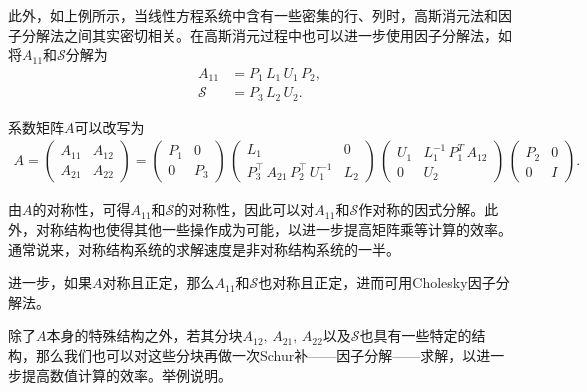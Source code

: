此外，如上例所示，当线性方程系统中含有一些密集的行、列时，高斯消元法和因子分解法之间其实密切相关。在高斯消元过程中也可以进一步使用因子分解法，如将$A_{11}$和$\mathcal{S}$分解为
\begin{equation*}
  \begin{split}
    A_{11} & = P_{1} \, L_{1} \, U_{1} \, P_{2}, \\
    \mathcal{S} & = P_{3} \, L_{2} \, U_{2}.
  \end{split}
\end{equation*}

系数矩阵$A$可以改写为
\begin{equation*}
  \begin{split}
    A =
    \begin{pmatrix}
      A_{11} & A_{12} \\
      A_{21} & A_{22}
    \end{pmatrix}
      =
      \begin{pmatrix}
        P_{1} & 0 \\
        0 & P_{3}
      \end{pmatrix}
      \,
      \begin{pmatrix}
        L_{1} & 0 \\
        P_{3}^{\top} \, A_{21} \, P_{2}^{\top} \, U_{1}^{-1} & L_{2}
      \end{pmatrix}
      \,
      \begin{pmatrix}
        U_{1} & L_{1}^{-1} \, P_{1}^{T} \, A_{12} \\
        0 & U_{2}
      \end{pmatrix}
      \,
      \begin{pmatrix}
        P_{2} & 0 \\
        0 & I
      \end{pmatrix}.
  \end{split}
\end{equation*}

由$A$的对称性，可得$A_{11}$和$\mathcal{S}$的对称性，因此可以对$A_{11}$和$\mathcal{S}$作对称的因式分解。此外，对称结构也使得其他一些操作成为可能，以进一步提高矩阵乘等计算的效率。通常说来，对称结构系统的求解速度是非对称结构系统的一半。

进一步，如果$A$对称且正定，那么$A_{11}$和$\mathcal{S}$也对称且正定，进而可用Cholesky因子分解法。

除了$A$本身的特殊结构之外，若其分块$A_{12}, \,A_{21}, \,A_{22}$以及$\mathcal{S}$也具有一些特定的结构，那么我们也可以对这些分块再做一次Schur补——因子分解——求解，以进一步提高数值计算的效率。举例说明。

